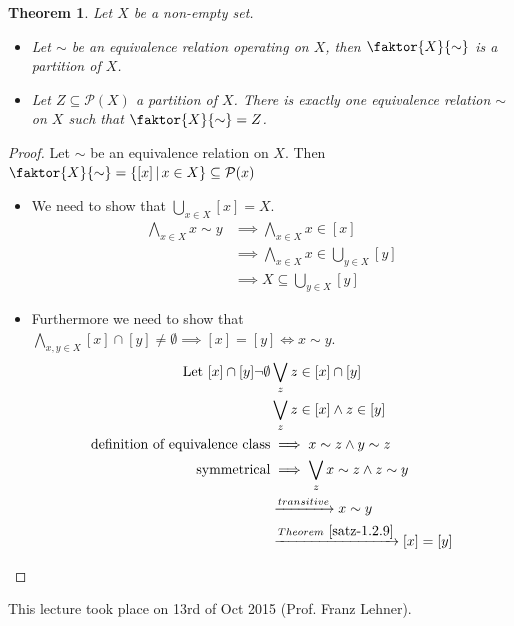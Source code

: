 \documentclass[a4paper,landscape,twocolumn]{article}
\newcommand\meta[3]{This #1 took place on #2 (#3).\par}
\newcommand\setdef[2]{\left\{#1\,\middle|\,#2\right\}}
\newtheorem{theorem}{Theorem}
\begin{document}
\begin{theorem}
  Let $X$ be a non-empty set.
  \begin{itemize}
    \item
      Let $\sim$ be an equivalence relation operating on $X$,
      then $\faktor{X}{\sim}$ is a partition of $X$.
    \item
      Let $Z \subseteq \mathcal{P}(X)$ a partition of $X$.
      There is exactly one equivalence relation $\sim$ on $X$
      such that $\faktor{X}{\sim} = Z$.
  \end{itemize}
\end{theorem}

\begin{proof}
  Let $\sim$ be an equivalence relation on $X$.
  Then $\faktor{X}{\sim} = \setdef{[x]}{x \in X} \subseteq \mathcal{P}(x)$

  \begin{itemize}
    \item We need to show that $\bigcup_{x \in X} [x] = X$.
      \begin{align*}
        \bigwedge_{x \in X} x \sim y &\implies \bigwedge_{x \in X} x \in [x] \\
                                   &\implies \bigwedge_{x \in X} x \in \bigcup_{y \in X} [y] \\
                                   &\implies X \subseteq \bigcup_{y \in X} [y]
      \end{align*}
    \item Furthermore we need to show that
          $\bigwedge_{x,y \in X} [x] \cap [y] \neq \emptyset \implies [x] = [y] \iff x \sim y$.
      \begin{align*}
          \text{Let } [x] \cap [y] \neg \emptyset & \bigvee_z z \in [x] \cap [y] \\
              & \bigvee_z z \in [x] \land z \in [y] \\
          \text{definition of equivalence class} & \implies x \sim z \land y \sim z \\
          \text{symmetrical} & \implies \bigvee_z x \sim z \land z \sim y \\
          & \xrightarrow{transitive} x \sim y \\
          & \xrightarrow{Theorem~\ref{satz-1.2.9}} [x] = [y]
      \end{align*}
  \end{itemize}
\end{proof}

\meta{lecture}{13rd of Oct 2015}{Prof. Franz Lehner}
\end{document}
